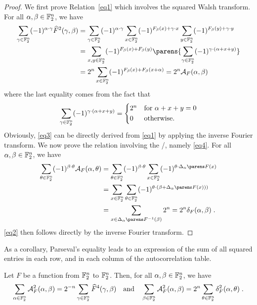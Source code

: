 \begin{proof}
    We first prove Relation~\eqref{eq1} which involves the squared Walsh transform.
    For all $\alpha,\beta \in \mathbb{F}_2^n$, we have
    \begin{align*}
        \sum_{\gamma \in \F_2^n} (-1)^{\iprod{\alpha}{\gamma}} \FC{F}^2(\gamma,\beta)
        &= \sum_{\gamma \in \F_2^n} (-1)^{\iprod{\alpha}{\gamma}}  \sum_{x \in \F_2^n} (-1)^{F_\beta(x) + \iprod{\gamma}{x}} \sum_{y \in \F_2^n} (-1)^{F_\beta(y) + \iprod{\gamma}{y}} \\
        &= \sum_{x,y \in \F_2^n} (-1)^{F_\beta(x)+F_\beta(y)} \parens{\sum_{\gamma \in \F_2^n} (-1)^{\iprod{\gamma}{(\alpha+x+y)}}}\\
        &= 2^n \sum_{x \in \F_2^n} (-1)^{F_\beta(x)+F_\beta(x+\alpha)} = 2^n \AC{F}(\alpha,\beta)
    \end{align*}
    where the last equality comes from the fact that
    \begin{equation*}
        \sum_{\gamma \in \F_2^n} (-1)^{\iprod{\gamma}{(\alpha+x+y)}} = \begin{cases*}
            2^n & for $\alpha+x+y = 0$\\
            0   & otherwise.
        \end{cases*}
    \end{equation*}
    Obviously, \cref{eq3} can be directly derived from \cref{eq1} by applying the inverse Fourier transform.
    We now prove the relation involving the \DDT/, namely \cref{eq4}.
    For all $\alpha,\beta \in \mathbb{F}_2^n$, we have
    \begin{align*}
        \sum_{\theta \in \F_2^n} (-1)^{\iprod{\beta}{\theta}} \AC{F}(\alpha,\theta)
        &= \sum_{\theta \in \F_2^n} (-1)^{\iprod{\beta}{\theta}} \sum_{x \in \F_2^n} (-1)^{\iprod{\theta}{\derive{\alpha}{F}(x)}}\\
        &= \sum_{x \in \F_2^n} \sum_{\theta \in \F_2^n} (-1)^{\iprod{\theta}{(\beta + \derive{\alpha}{F}(x)))}}\\
        &= \sum_{x \in \derive{\alpha}{F}^{-1}(\beta)} 2^n = 2^n \DC{F}(\alpha,\beta)\;.
    \end{align*}
    \cref{eq2} then follows directly by the inverse Fourier transform.
\end{proof}

As a corollary, Parseval's equality leads to an expression of the sum of all squared entries in each row, and in each column of the autocorrelation table.

\begin{corollary}\label{cor:Parseval}
    Let $F$ be a function from $\mathbb{F}_2^n$ to $\mathbb{F}_2^n$.
    Then, for all $\alpha,\beta \in \mathbb{F}_2^n$, we have
    \begin{equation*}
        \sum_{\alpha \in \mathbb{F}_2^n} \mathcal{A}_{F}^2(\alpha,\beta) = 2^{-n} \sum_{\gamma \in \mathbb{F}_2^n} \widehat{F}^4(\gamma,\beta) \quad \text{and} \quad \sum_{\beta \in \mathbb{F}_2^n} \mathcal{A}_{F}^2(\alpha,\beta) = 2^n \sum_{\theta \in \mathbb{F}_2^n} \delta_{F}^2(\alpha,\theta)\;.
    \end{equation*}
\end{corollary}

